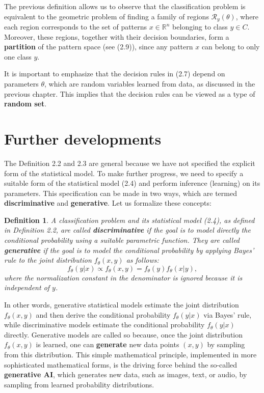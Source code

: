 \documentclass{report}
\newtheorem{definition}{Definition}[chapter]
\begin{document}
The previous definition allows us to observe that the classification problem is equivalent to the geometric problem of finding a family of regions $\mathcal{R}_y(\theta)$, where each region corresponds to the set of patterns $x \in \mathbb{R}^n$ belonging to class $y \in C$. Moreover, these regions, together with their decision boundaries, form a \textbf{partition} of the pattern space (see (2.9)), since any pattern $x$ can belong to only one class $y$.

It is important to emphasize that the decision rules in (2.7) depend on parameters $\theta$, which are random variables learned from data, as discussed in the previous chapter. This implies that the decision rules can be viewed as a type of \textbf{random set}.

\section{Further developments}
The Definition 2.2 and 2.3 are general because we have not specified the explicit form of the statistical model. To make further progress, we need to specify a suitable form of the statistical model (2.4) and perform inference (learning) on its parameters. This specification can be made in two ways, which are termed \textbf{discriminative} and \textbf{generative}. Let us formalize these concepts:

\begin{definition}
A classification problem and its statistical model (2.4), as defined in Definition 2.2, are called \textbf{discriminative} if the goal is to model directly the conditional probability using a suitable parametric function. They are called \textbf{generative} if the goal is to model the conditional probability by applying Bayes' rule to the joint distribution $f_\theta(x,y)$ as follows:
\begin{equation}
f_\theta(y|x) \propto f_\theta(x,y) = f_\theta(y)f_\theta(x|y),
\end{equation}
where the normalization
constant in the denominator is ignored because it is independent of $y$.
\end{definition}

In other words, generative statistical models estimate the joint distribution $f_\theta(x,y)$ and then derive the conditional probability $f_\theta(y|x)$ via Bayes' rule, while discriminative models estimate the conditional probability $f_\theta(y|x)$ directly. Generative models are called so because, once the joint distribution $f_\theta(x,y)$ is learned, one can \textbf{generate} new data points $(x,y)$ by sampling from this distribution. This simple mathematical principle, implemented in more sophisticated mathematical forms, is the driving force behind the so-called \textbf{generative AI}, which generates new data, such as images, text, or audio, by sampling from learned probability distributions.
\end{document}

